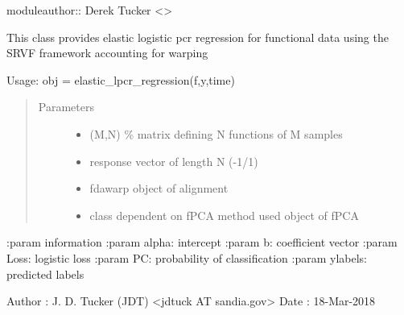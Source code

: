 \documentclass[letterpaper,10pt,english]{sphinxmanual}
\begin{document}
moduleauthor:: Derek Tucker \textless{}\textgreater{}

\begin{fulllineitems}
\label{\detokenize{pcr_regression:pcr_regression.elastic_lpcr_regression}}
This class provides elastic logistic pcr regression for functional 
data using the SRVF framework accounting for warping

Usage:  obj = elastic\_lpcr\_regression(f,y,time)
\begin{quote}\begin{description}
\item[{Parameters}] \leavevmode\begin{itemize}
\item {} 
 \textendash{} (M,N) \% matrix defining N functions of M samples

\item {} 
 \textendash{} response vector of length N (-1/1)

\item {} 
 \textendash{} fdawarp object of alignment

\item {} 
 \textendash{} class dependent on fPCA method used object of fPCA

\end{itemize}

\end{description}\end{quote}

:param information
:param alpha: intercept
:param b: coefficient vector
:param Loss: logistic loss
:param PC: probability of classification
:param ylabels: predicted labels

Author :  J. D. Tucker (JDT) \textless{}jdtuck AT sandia.gov\textgreater{}
Date   :  18-Mar-2018


\end{fulllineitems}
\end{document}
